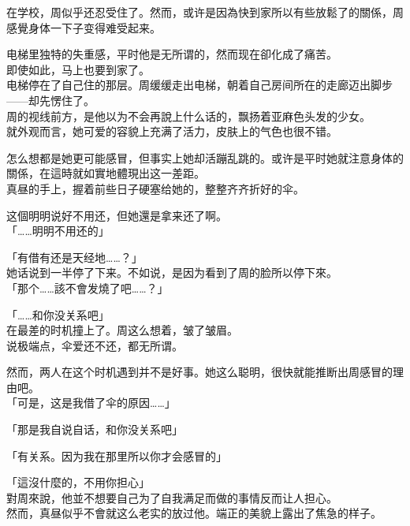 在学校，周似乎还忍受住了。然而，或许是因為快到家所以有些放鬆了的關係，周感覺身体一下子变得难受起来。

电梯里独特的失重感，平时他是无所谓的，然而现在卻化成了痛苦。\\

即使如此，马上也要到家了。\\

电梯停在了自己住的那层。周缓缓走出电梯，朝着自己房间所在的走廊迈出脚步——却先愣住了。\\

周的视线前方，是他以为不会再說上什么话的，飘扬着亚麻色头发的少女。\\

就外观而言，她可爱的容貌上充满了活力，皮肤上的气色也很不错。

怎么想都是她更可能感冒，但事实上她却活蹦乱跳的。或许是平时她就注意身体的關係，在這時就如實地體現出这一差距。\\

真昼的手上，握着前些日子硬塞给她的，整整齐齐折好的伞。

这個明明说好不用还，但她還是拿来还了啊。\\

「……明明不用还的」

「有借有还是天经地……？」\\

她话说到一半停了下来。不如说，是因为看到了周的脸所以停下來。\\

「那个……該不會发燒了吧……？」

「……和你没关系吧」\\

在最差的时机撞上了。周这么想着，皱了皱眉。\\

说极端点，伞爱还不还，都无所谓。

然而，两人在这个时机遇到并不是好事。她这么聪明，很快就能推断出周感冒的理由吧。\\

「可是，这是我借了伞的原因……」

「那是我自说自话，和你没关系吧」

「有关系。因为我在那里所以你才会感冒的」

「這沒什麼的，不用你担心」\\

對周來說，他並不想要自己为了自我满足而做的事情反而让人担心。\\

然而，真昼似乎不會就这么老实的放过他。端正的美貌上露出了焦急的样子。\\

